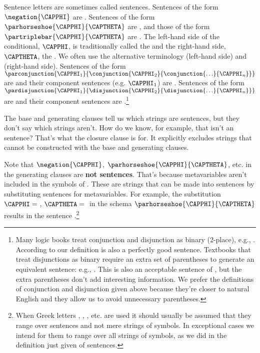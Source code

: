 Sentence letters are sometimes called  sentences.
Sentences of the form $\negation{\CAPPHI}$ are .
Sentences of the form $\parhorseshoe{\CAPPHI}{\CAPTHETA}$ are , and those of the form $\partriplebar{\CAPPHI}{\CAPTHETA}$ are . 
The left-hand side of the conditional, $\CAPPHI$, is traditionally called the  and the right-hand side, $\CAPTHETA$, the . 
We often use the alternative terminology  (left-hand side) and  (right-hand side).
Sentences of the form $\parconjunction{\CAPPHI_1}{\conjunction{\CAPPHI_2}{\conjunction{\ldots}{\CAPPHI_{\integer{n}}}}}$ are  and their component sentences (e.g. $\CAPPHI_1$) are .
Sentences of the form $\pardisjunction{\CAPPHI_1}{\disjunction{\CAPPHI_2}{\disjunction{\ldots}{\CAPPHI_{\integer{n}}}}}$ are  and their component sentences are .\footnote{
	Many logic books treat conjunction and disjunction as binary (2-place), e.g., \mention{$\pardisjunction{\Al}{\Bl}$}. According to our definition \mention{$\pardisjunction{\disjunction{\Al}{\Bl}}{\Cl}$} is also a perfectly good sentence. Textbooks that treat disjunctions as binary require an extra set of parentheses to generate an equivalent sentence: e.g., \mention{$\pardisjunction{\pardisjunction{\Al}{\Bl}}{\Cl}$}. This is also an acceptable sentence of \GSL{}, but the extra parentheses don't add interesting information. We prefer the definitions of conjunction and disjunction given above because they're closer to natural English and they allow us to avoid unnecessary parentheses.
}

The base and generating clauses tell us which strings are sentences, but they don't say which strings aren't.
How do we know, for example, that \mention{$(\Bl(\HORSESHOE{}\Al$} isn't an \GSL{} sentence?
That's what the closure clause is for.
It explicitly excludes strings that cannot be constructed with the base and generating clauses.

Note that $\negation{\CAPPHI}$, $\parhorseshoe{\CAPPHI}{\CAPTHETA}$, etc. in the generating clauses are \textbf{not \GSL{} sentences}.
That's because metavariables aren't included in the symbols of \GSL{}.
These  are strings that can be made into sentences by substituting sentences for metavariables.
For example, the substitution $\CAPPHI=\;$\mention{$\Al$}, $\CAPTHETA=\;$\mention{$\partriplebar{\Cl}{\Dl}$} in the schema $\parhorseshoe{\CAPPHI}{\CAPTHETA}$ results in the sentence \mention{$\parhorseshoe{\Al}{\partriplebar{\Cl}{\Dl}}$}.\footnote{When Greek letters \mention{$\CAPPHI$}, \mention{$\CAPPSI$}, \mention{$\CAPTHETA$}, etc. are used it should usually be assumed that they range over \GSL{} sentences and not mere strings of \GSL{} symbols. 
In exceptional cases we intend for them to range over all strings of \GSL{} symbols, as we did in the definition just given of \GSL{} sentences.}

